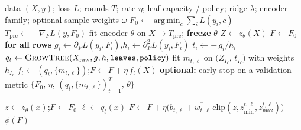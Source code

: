 \documentclass[11pt]{article}
\newcommand{\zt}{z_{\theta}}
\newcommand{\Il}{I_{\ell}}
\newcommand{\trans}{^{\top}}
\DeclareMathOperator*{\argmin}{arg\,min}
\begin{document}
\begin{algorithm}[t]
\caption{RepLeafGBM training}
\label{alg:train}
\begin{algorithmic}[1]
\Require data $(X, y)$; loss $L$; rounds $T$; rate $\eta$; leaf capacity / policy;
ridge $\lambda$; encoder family; optional sample weights $\omega$
\State $F_0 \gets \argmin_c \sum_i L(y_i, c)$
\State $T_{\mathrm{pre}} \gets -\,\nabla_F L(y, F_0)$
\State fit encoder $\theta$ on $X \!\to\! T_{\mathrm{pre}}$; \textbf{freeze} $\theta$
\State $Z \gets \zt(X)$ 
\State $F \gets F_0$ \textbf{for all rows}
  \State $g_i \gets \partial_F L(y_i, F_i)$,\quad $h_i \gets \partial_F^2 L(y_i, F_i)$
  \State $t_i \gets -\,g_i / h_i$ 
  \State $q_t \gets \textsc{GrowTree}(X_{\text{raw}}, g, h, \texttt{leaves}, \texttt{policy})$
  \For{each leaf $\ell$ with rows $\Il$}
    \State fit $m_{t,\ell}$ on $\big(Z_{\Il},\, t_{\Il}\big)$ with weights $h_{\Il}$
  \EndFor
  \State $f_t \gets (q_t, \{m_{t,\ell}\})$;\quad $F \gets F + \eta\, f_t(X)$
  \State \textbf{optional:} early-stop on a validation metric
\EndFor
\State \Return $\big\{F_0,\, \eta,\, (q_t, \{m_{t,\ell}\})_{t=1}^{T},\, \theta\big\}$
\end{algorithmic}
\end{algorithm}

\begin{algorithm}[t]
\caption{RepLeafGBM prediction for a query $x$}
\label{alg:predict}
\begin{algorithmic}[1]
\State $z \gets \zt(x)$;\quad $F \gets F_0$
  \State $\ell \gets q_t(x)$ 
  \State $F \gets F + \eta\big(b_{t,\ell} + w_{t,\ell}^{\!\trans}\,
    \mathrm{clip}(z, z_{\min}^{t,\ell}, z_{\max}^{t,\ell})\big)$
\EndFor
\State \Return $\phi(F)$ 
\end{algorithmic}
\end{algorithm}
\end{document}
